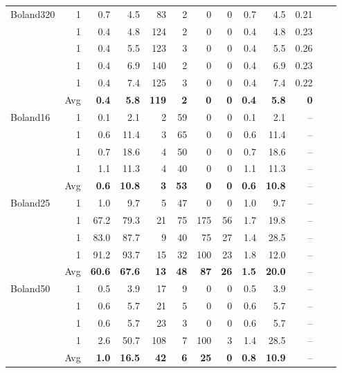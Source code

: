 \documentclass[11.5pt]{article}
\begin{document}
\begin{table}[h!]
\begin{tabular}{l|r|rr|rrrrrr|rrr}
\cmidrule(r){3-11}
Boland320 & 1 & 0.7 & 4.5 & 83 & 2 & 0 & 0 & 0.7 & 4.5 & 0.21\\
         & 1 & 0.4 & 4.8 & 124 & 2 & 0 & 0 & 0.4 & 4.8 & 0.23\\
         & 1 & 0.4 & 5.5 & 123 & 3 & 0 & 0 & 0.4 & 5.5 & 0.26\\
         & 1 & 0.4 & 6.9 & 140 & 2 & 0 & 0 & 0.4 & 6.9 & 0.23\\
         & 1 & 0.4 & 7.4 & 125 & 3 & 0 & 0 & 0.4 & 7.4 & 0.22\\
\cmidrule(r){3-11}
         & Avg & \bf 0.4 & \bf 5.8 & \bf 119 & \bf 2 & \bf 0 & \bf 0 & \bf 0.4 & \bf 5.8 & \bf 0\\
\cmidrule(r){3-11}
Boland16 & 1 & 0.1 & 2.1 & 2 & 59 & 0 & 0 & 0.1 & 2.1 & --\\
         & 1 & 0.6 & 11.4 & 3 & 65 & 0 & 0 & 0.6 & 11.4 & --\\
         & 1 & 0.7 & 18.6 & 4 & 50 & 0 & 0 & 0.7 & 18.6 & --\\
         & 1 & 1.1 & 11.3 & 4 & 40 & 0 & 0 & 1.1 & 11.3 & --\\
\cmidrule(r){3-11}
         & Avg & \bf 0.6 & \bf 10.8 & \bf 3 & \bf 53 & \bf 0 & \bf 0 & \bf 0.6 & \bf 10.8 & --\\
\cmidrule(r){3-11}
Boland25 & 1 & 1.0 & 9.7 & 5 & 47 & 0 & 0 & 1.0 & 9.7 & --\\
         & 1 & 67.2 & 79.3 & 21 & 75 & 175 & 56 & 1.7 & 19.8 & --\\
         & 1 & 83.0 & 87.7 & 9 & 40 & 75 & 27 & 1.4 & 28.5 & --\\
         & 1 & 91.2 & 93.7 & 15 & 32 & 100 & 23 & 1.8 & 12.0 & --\\
\cmidrule(r){3-11}
         & Avg & \bf 60.6 & \bf 67.6 & \bf 13 & \bf 48 & \bf 87 & \bf 26 & \bf 1.5 & \bf 20.0 & --\\
\cmidrule(r){3-11}
Boland50  & 1 & 0.5 & 3.9 & 17 & 9 & 0 & 0 & 0.5 & 3.9 & --\\
         & 1 & 0.6 & 5.7 & 21 & 5 & 0 & 0 & 0.6 & 5.7 & --\\
         & 1 & 0.6 & 5.7 & 23 & 3 & 0 & 0 & 0.6 & 5.7 & --\\
         & 1 & 2.6 & 50.7 & 108 & 7 & 100 & 3 & 1.4 & 28.5 & --\\
\cmidrule(r){3-11}
         & Avg & \bf 1.0 & \bf 16.5 & \bf 42 & \bf 6 & \bf 25 & \bf 0 & \bf 0.8 & \bf 10.9 & --\\
\cmidrule(r){3-11}
\bottomrule
\end{tabular}
\end{table}
\end{document}
